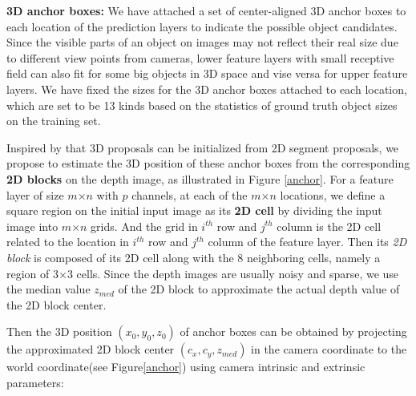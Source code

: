 \documentclass[10pt,twocolumn,letterpaper]{article}
\begin{document}
	\vspace{1mm}
	\noindent\textbf{3D anchor boxes:} We have attached a set of center-aligned 3D anchor boxes to each location of the prediction layers to indicate the possible object candidates. Since the visible parts of an object on images may not reflect their real size due to different view points from cameras, lower feature layers with small receptive field can also fit for some big objects in 3D space and vise versa for upper feature layers. We have fixed the sizes for the 3D anchor boxes attached to each location, which are set to be 13 kinds based on the statistics of ground truth object sizes on the training set.\par 
	Inspired by \cite{Deng2017} that 3D proposals can be initialized from 2D segment proposals, we propose to estimate the 3D position of these anchor boxes from the corresponding \textbf{2D blocks} on the depth image, as illustrated in Figure \ref{anchor}.
	For a feature layer of size $m$$\times$$n$ with $p$ channels, at each of the $m$$\times$$n$ locations, we define a square region on the initial input image as its \textbf{2D cell} by dividing the input image into $m$$\times$$n$ grids. And the grid in $i^{th}$ row and $j^{th}$ column is the 2D cell related to the location in $i^{th}$ row and $j^{th}$ column of the feature layer. Then its \textit{2D block} is composed of its 2D cell along with the $8$ neighboring cells, namely a region of $3$$\times$$3$ cells.
	Since the depth images are usually noisy and sparse, we use the median value $z_{med}$ of the 2D block to approximate the actual depth value of the 2D block center. \par
	Then the 3D position $(x_{0},y_{0},z_{0})$ of anchor boxes can be obtained by projecting the approximated 2D block center $(c_{x},c_{y},z_{med})$ in the camera coordinate to the world coordinate(see Figure\ref{anchor}) using camera intrinsic and extrinsic parameters:\par 
\end{document}

